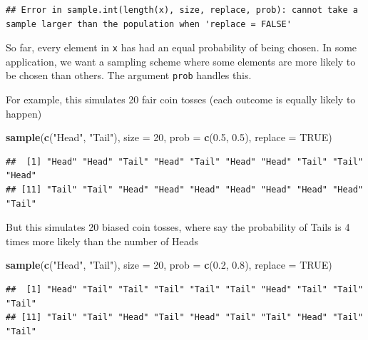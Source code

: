 \documentclass[]{book}
\newenvironment{Shaded}{\begin{snugshade}}{\end{snugshade}}
\newcommand{\KeywordTok}[1]{\textcolor[rgb]{0.13,0.29,0.53}{\textbf{#1}}}
\newcommand{\DataTypeTok}[1]{\textcolor[rgb]{0.13,0.29,0.53}{#1}}
\newcommand{\DecValTok}[1]{\textcolor[rgb]{0.00,0.00,0.81}{#1}}
\newcommand{\FloatTok}[1]{\textcolor[rgb]{0.00,0.00,0.81}{#1}}
\newcommand{\StringTok}[1]{\textcolor[rgb]{0.31,0.60,0.02}{#1}}
\newcommand{\OtherTok}[1]{\textcolor[rgb]{0.56,0.35,0.01}{#1}}
\newcommand{\NormalTok}[1]{#1}
\theoremstyle{definition}
\theoremstyle{definition}
\theoremstyle{definition}
\theoremstyle{remark}
\begin{document}
\begin{verbatim}
## Error in sample.int(length(x), size, replace, prob): cannot take a sample larger than the population when 'replace = FALSE'
\end{verbatim}

So far, every element in \texttt{x} has had an equal probability of
being chosen. In some application, we want a sampling scheme where some
elements are more likely to be chosen than others. The argument
\texttt{prob} handles this.

For example, this simulates 20 fair coin tosses (each outcome is equally
likely to happen)

\begin{Shaded}
\begin{Highlighting}[]
\KeywordTok{sample}\NormalTok{(}\KeywordTok{c}\NormalTok{(}\StringTok{"Head"}\NormalTok{, }\StringTok{"Tail"}\NormalTok{), }\DataTypeTok{size =} \DecValTok{20}\NormalTok{, }\DataTypeTok{prob =} \KeywordTok{c}\NormalTok{(}\FloatTok{0.5}\NormalTok{, }\FloatTok{0.5}\NormalTok{), }\DataTypeTok{replace =} \OtherTok{TRUE}\NormalTok{)}
\end{Highlighting}
\end{Shaded}

\begin{verbatim}
##  [1] "Head" "Head" "Tail" "Head" "Tail" "Head" "Head" "Tail" "Tail" "Head"
## [11] "Tail" "Tail" "Head" "Head" "Head" "Head" "Head" "Head" "Head" "Tail"
\end{verbatim}

But this simulates 20 biased coin tosses, where say the probability of
Tails is 4 times more likely than the number of Heads

\begin{Shaded}
\begin{Highlighting}[]
\KeywordTok{sample}\NormalTok{(}\KeywordTok{c}\NormalTok{(}\StringTok{"Head"}\NormalTok{, }\StringTok{"Tail"}\NormalTok{), }\DataTypeTok{size =} \DecValTok{20}\NormalTok{, }\DataTypeTok{prob =} \KeywordTok{c}\NormalTok{(}\FloatTok{0.2}\NormalTok{, }\FloatTok{0.8}\NormalTok{), }\DataTypeTok{replace =} \OtherTok{TRUE}\NormalTok{)}
\end{Highlighting}
\end{Shaded}

\begin{verbatim}
##  [1] "Head" "Tail" "Tail" "Tail" "Tail" "Tail" "Head" "Tail" "Tail" "Tail"
## [11] "Tail" "Tail" "Head" "Tail" "Head" "Tail" "Tail" "Head" "Tail" "Tail"
\end{verbatim}
\end{document}

